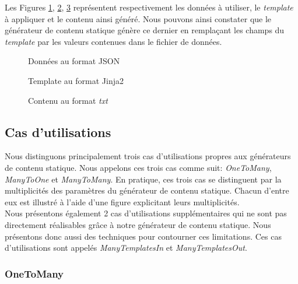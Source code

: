 		\begin{exmpl}
			\label{exmpl:GDCS}
			Les Figures \ref{exmpl:GDCS:data}, \ref{exmpl:GDCS:template}, \ref{exmpl:GDCS:content} représentent respectivement les données à utiliser, le \textit{template} à appliquer et le contenu ainsi généré. Nous pouvons ainsi constater que le générateur de contenu statique génère ce dernier en remplaçant les champs du \textit{template} par les valeurs contenues dans le fichier de données.
			\begin{figure}[!]
				\centering
				
				\caption{Données au format JSON}
				\label{exmpl:GDCS:data}
			\end{figure}				
			\begin{figure}[!]
				\centering
				
				\caption{Template au format Jinja2}
				\label{exmpl:GDCS:template}
			\end{figure}%
			\begin{figure}[!]
				\centering
				
				\caption{Contenu au format \textit{txt}}
				\label{exmpl:GDCS:content}
			\end{figure}			
			
		\end{exmpl}

	\subsection{Cas d'utilisations}
	
		Nous distinguons principalement trois cas d'utilisations propres aux générateurs de contenu statique. Nous appelons ces trois cas comme suit: \textit{OneToMany}, \textit{ManyToOne} et \textit{ManyToMany}. En pratique, ces trois cas se distinguent par la multiplicités des paramètres du générateur de contenu statique. Chacun d'entre eux est illustré à l'aide d'une figure explicitant leurs multiplicités.\\
		
		Nous présentons également 2 cas d'utilisations supplémentaires qui ne sont pas directement réalisables grâce à notre générateur de contenu statique. Nous présentons donc aussi des techniques pour contourner ces limitations. Ces cas d'utilisations sont appelés \textit{ManyTemplatesIn} et \textit{ManyTemplatesOut}.\\
		
		\subsubsection*{OneToMany}
		
